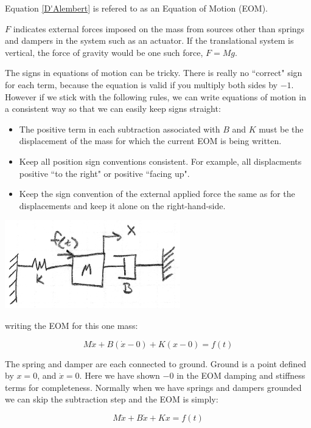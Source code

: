 Equation \ref{D'Alembert} is refered to as an Equation of Motion (EOM).

$F$ indicates external forces imposed on the mass from sources other than springs and dampers in the system such as an actuator.  If the translational system is vertical, the force of gravity would be one such force, $F=Mg$.

The signs in equations of motion can be tricky.   There is really no ``correct" sign for each term, because the equation is valid if you multiply both sides by $-1$.   However if we stick with the following rules, we can write equations of motion in a consistent way so that we can easily keep signs straight:

\begin{itemize}

  \item The positive term in each subtraction associated with $B$ and $K$ must be the displacement of the mass for which the current EOM is being written.
  \item Keep all position sign conventions consistent.  For example, all displacments positive ``to the right" or positive ``facing up".
  \item Keep the sign convention of the external applied force the same as for the displacements and keep it alone on the right-hand-side.

\end{itemize}






\begin{ExampleSmall}

\includegraphics[width=3.0in]{figs02/00721a.png}

writing the EOM for this one mass:

\[
M\ddot{x} + B(\dot{x} - 0) + K(x-0) = f(t)
\]

The spring and damper are each connected to ground.  Ground is a point defined by $x=0$, and $\dot{x}=0$.   Here we have shown $-0$ in the EOM damping and stiffness terms for completeness.
Normally when we have springs and dampers grounded we can skip the subtraction step and the EOM is simply:

\[
M\ddot{x} + B\dot{x} + Kx = f(t)
\]

\end{ExampleSmall}





